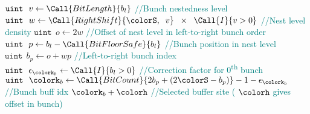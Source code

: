 \begin{algorithm}[H]
\begin{minipage}{0.53\textwidth}
\begin{algorithmic}[1]
        \State $\texttt{uint} ~ ~ v \gets \Call{BitLength}{b_l}$ \textcolor{teal}{\small//Bunch nestedness level}
        \State $\texttt{uint} ~ ~ w \gets \Call{RightShift}{\colorS, \;\; v} \;\; \times \;\;\Call{I}{v > 0}$ \textcolor{teal}{\small//Nest level density}
        \State $\texttt{uint} ~ ~ o \gets 2w$  \textcolor{teal}{\small//Offset of nest level in left-to-right bunch order}
        \State $\texttt{uint} ~ ~ p \gets b_l - \Call{BitFloorSafe}{b_l}$ \textcolor{teal}{\small//Bunch position in nest level}
        \State $\texttt{uint} ~ ~ b_p \gets o + wp$ \textcolor{teal}{\small//Left-to-right bunch index}
        \State $\texttt{uint} ~ ~ \epsilon_{\colork_b} \gets \Call{I}{b_l > 0}$  \textcolor{teal}{\small//Correction factor for 0\textsuperscript{th} bunch}
        \State $\texttt{uint} ~ ~ \colork_b \gets \Call{BitCount}{2b_p +(2\colorS - b_p)} - 1 - \epsilon_{\colork_b}$  \textcolor{teal}{\small//Bunch buff idx}
        \State \Return $\colork_b + \colorh$ \textcolor{teal}{\small//Selected buffer site (\hv{} $\colorh$ gives offset in bunch)}
    \end{algorithmic}
\end{minipage}
\end{algorithm}
